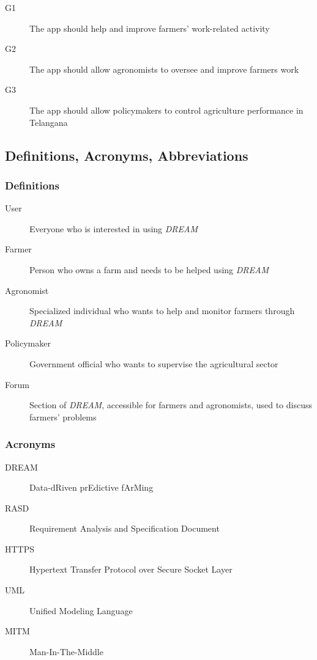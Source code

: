 \begin{description}
    \item [G1] The app should help and improve farmers' work-related activity
    \item [G2] The app should allow agronomists to oversee and improve farmers work
    \item [G3] The app should allow policymakers to control agriculture performance in Telangana
\end{description}

\subsection{Definitions, Acronyms, Abbreviations}

\subsubsection{Definitions}

\begin{description}
    \item [User] Everyone who is interested in using \emph{DREAM}
    \item [Farmer] Person who owns a farm and needs to be helped using \emph{DREAM}
    \item [Agronomist] Specialized individual who wants to help and monitor farmers through \emph{DREAM}
    \item [Policymaker] Government official who wants to supervise the agricultural sector
    \item [Forum] Section of \emph{DREAM}, accessible for farmers and agronomists, used to discuss farmers' problems
\end{description}

\subsubsection{Acronyms}

\begin{description}
    \item [DREAM] Data-dRiven prEdictive fArMing
    \item [RASD] Requirement Analysis and Specification Document
    \item [HTTPS] Hypertext Transfer Protocol over Secure Socket Layer
    \item [UML] Unified Modeling Language
    \item [MITM] Man-In-The-Middle
\end{description}

